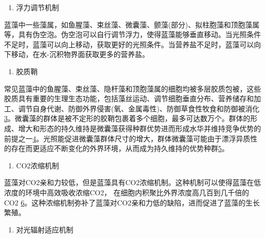 \documentclass[]{book}
\providecommand{\tightlist}{%
  \setlength{\itemsep}{0pt}\setlength{\parskip}{0pt}}
\begin{document}
\begin{enumerate}
\def\labelenumi{\arabic{enumi}.}
\tightlist
\item
  浮力调节机制
\end{enumerate}

蓝藻中一些藻属，如鱼腥藻、束丝藻、微囊藻、颤藻(部分)、拟柱胞藻和顶胞藻属等，具有伪空泡。伪空泡可以自行调节浮力，使得蓝藻能够垂直移动。当光照条件不足时，蓝藻可以向上移动，获取更好的光照条件。当营养盐不足时，蓝藻可以向下移动，在水-沉积物界面获取更多的营养盐。

\begin{enumerate}
\def\labelenumi{\arabic{enumi}.}
\setcounter{enumi}{1}
\tightlist
\item
  胶质鞘
\end{enumerate}

常见蓝藻中的鱼腥藻、束丝藻、隐杆藻和顶胞藻属的细胞均被多层胶质包被，这些胶质具有重要的生理生态功能，包括藻丝运动、调节细胞垂直分布、营养储存和加工、调节自身代谢、防御外界侵害(氧、金属毒性)、防御草食性牧食和防御被消化\href{Puga\%20A\%20P,\%20Abreu\%20C\%20A,\%20et\%20al.\%20J.\%20of\%20Environ.\%20Manage.,\%202015,\%20159:\%2086–93.}{3}。微囊藻的群体是被不定形的胶鞘包裹着多个细胞，最多可达数万个。群体的形成、增大和形态的持久维持是微囊藻获得种群优势进而形成水华并维持竞争优势的前提之一\href{Khan\%20S,\%20Cai\%20Chao,\%20et\%20al．\%20Environ.\%20Sci.\%20\&\%20Technol.,\%202013,\%2047\%20:\%208624-8632．}{4}。光照能促进微囊藻群体尺寸的增大，群体微囊藻可能由于漂浮异质性的存在而更适应不断变化的外界环境，从而成为持久维持的优势种群\href{Bi\%20H,\%20Huang\%20X,\%20et\%20al.\%20Small\%202014,\%2010,\%203544.}{5}。

\begin{enumerate}
\def\labelenumi{\arabic{enumi}.}
\setcounter{enumi}{2}
\tightlist
\item
  CO2浓缩机制
\end{enumerate}

蓝藻对CO2亲和力较低，但是蓝藻具有CO2浓缩机制。这种机制可以使得蓝藻在低浓度的环境中高效吸收浓缩CO2，
在细胞内积聚比外界浓度高几百到几千倍的 CO2
\href{Gupta\%20V\%20K,\%20Ganjali\%20M\%20R,\%20et\%20al.\%20Chemical\%20Engineering\%20Journal,\%202012,\%20197:\%20330.}{6}。这种浓缩机制弥补了蓝藻对CO2亲和力低的缺陷，进而促进了蓝藻的生长繁殖。

\begin{enumerate}
\def\labelenumi{\arabic{enumi}.}
\setcounter{enumi}{3}
\tightlist
\item
  对光辐射适应机制
\end{enumerate}
\end{document}
